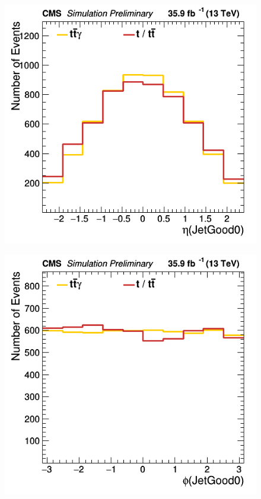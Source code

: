 \documentclass[11pt]{scrartcl}
\begin{document}
	\begin{figure}[H]
	\centering
	\begin{minipage}{.5\textwidth}
	  \centering
	  \includegraphics[width=0.75\linewidth]{figures/Select1/JetGood0_eta.png}
	  \label{fig:JetGood0eta}
	\end{minipage}%
	\begin{minipage}{.5\textwidth}
	  \centering
	  \includegraphics[width=0.75\linewidth]{figures/Select1/JetGood0_phi.png}
	  \label{fig:JetGood0phi}
	\end{minipage}
	\end{figure}
	
\end{document}
